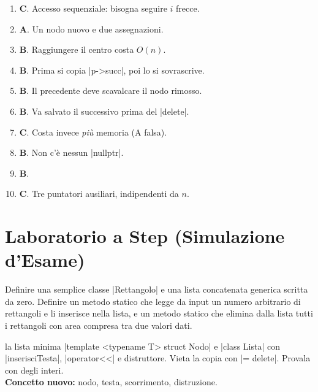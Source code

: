 \begin{soluzione}
\begin{enumerate}[label=\textbf{\arabic*.}]
  \item \textbf{C}. Accesso sequenziale: bisogna seguire $i$ frecce.
  \item \textbf{A}. Un nodo nuovo e due assegnazioni.
  \item \textbf{B}. Raggiungere il centro costa $O(n)$.
  \item \textbf{B}. Prima si copia \cc|p->succ|, poi lo si sovrascrive.
  \item \textbf{B}. Il precedente deve scavalcare il nodo rimosso.
  \item \textbf{B}. Va salvato il successivo prima del \cc|delete|.
  \item \textbf{C}. Costa invece \emph{più} memoria (A falsa).
  \item \textbf{B}. Non c'è nessun \cc|nullptr|.
  \item \textbf{B}.
  \item \textbf{C}. Tre puntatori ausiliari, indipendenti da $n$.
\end{enumerate}
\end{soluzione}

\section{Laboratorio a Step (Simulazione d'Esame)}

\begin{traccia}
Definire una semplice classe \cc|Rettangolo| e una lista concatenata generica scritta da
zero. Definire un metodo statico che legge da input un numero arbitrario di rettangoli e
li inserisce nella lista, e un metodo statico che elimina dalla lista tutti i rettangoli
con area compresa tra due valori dati.
\end{traccia}

\begin{step}{la lista minima}
\cc|template <typename T> struct Nodo| e \cc|class Lista| con \cc|inserisciTesta|,
\cc|operator<<| e distruttore. Vieta la copia con \cc|= delete|. Provala con degli
interi.\\[0.3em]
\textbf{Concetto nuovo:} nodo, testa, scorrimento, distruzione.
\end{step}

